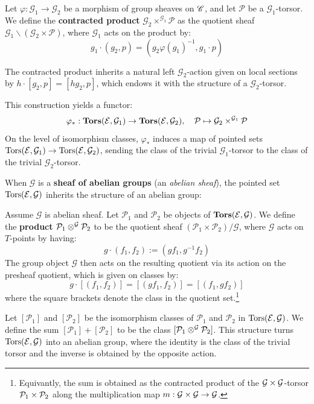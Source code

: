 \begin{definition}
Let $\varphi: \mathcal{G}_1 \to \mathcal{G}_2$ be a morphism of group 
sheaves on $\mathscr{C}$, and let $\mathcal{P}$ be a $\mathcal{G}_1$-torsor. We define the \textbf{contracted product} $\mathcal{G}_2 \times^{\mathcal{G}_1} \mathcal{P}$ as the quotient sheaf $\mathcal{G}_1 \backslash (\mathcal{G}_2 \times \mathcal{P})$, where $\mathcal{G}_1$ acts on the product by:
\[ g_1 \cdot (g_2, p) = (g_2 \varphi(g_1)^{-1}, g_1 \cdot p) \]

The contracted product inherits a natural left $\mathcal{G}_2$-action given on local sections by $h \cdot [g_2, p] = [h g_2, p]$, which endows it with the structure of a $\mathcal{G}_2$-torsor. 
\end{definition}

This construction yields a functor:
\[ \varphi_*: \mathbf{Tors}(\mathcal{E}, \mathcal{G}_1) \to \mathbf{Tors}(\mathcal{E}, \mathcal{G}_2), \quad \mathcal{P} \mapsto \mathcal{G}_2 \times^{\mathcal{G}_1} \mathcal{P} \]
On the level of isomorphism classes, $\varphi_*$ induces a map of pointed sets $\mathrm{Tors}(\mathcal{E}, \mathcal{G}_1) \to \mathrm{Tors}(\mathcal{E}, \mathcal{G}_2)$, sending the class of the trivial $\mathcal{G}_1$-torsor to the class of the trivial $\mathcal{G}_2$-torsor.

When $\mathcal{G}$ is a \textbf{sheaf of abelian groups} (an \textit{abelian sheaf}), the pointed set $\mathrm{Tors}(\mathcal{E}, \mathcal{G})$ 
inherits the structure of an abelian group:
\begin{definition}
    Assume $\mathcal{G}$ is abelian sheaf. Let $\mathcal{P}_1$ and $\mathcal{P}_2$ be objects of $\mathbf{Tors}(\mathcal{E}, \mathcal{G})$. 
    We define the \textbf{product} $\mathcal{P}_1 \otimes^{\mathcal{G}} \mathcal{P}_2$ to be the quotient sheaf 
    $(\mathcal{P}_1 \times \mathcal{P}_2)/\mathcal{G}$, where $\mathcal{G}$ acts on $T$-points by having:
    \[ g \cdot (f_1, f_2) := (g f_1, g^{-1} f_2) \]
    The group object $\mathcal{G}$ then acts on the resulting quotient via its action on the presheaf quotient, which is given on classes by:
    \[ g \cdot [(f_1, f_2)] = [(g f_1, f_2)] = [(f_1, g f_2)] \]
    where the square brackets denote the class in the quotient set.\footnote{
    Equivantly, the sum is obtained as the contracted product of the $\mathcal{G} \times \mathcal{G}$-torsor $\mathcal{P}_1 \times \mathcal{P}_2$ along the multiplication map
$m: \mathcal{G} \times \mathcal{G} \to \mathcal{G}$. }
\end{definition}

Let $[\mathcal{P}_1]$ and $[\mathcal{P}_2]$ be the isomorphism classes of $\mathcal{P}_1$ and $\mathcal{P}_2$ in $\mathrm{Tors}(\mathcal{E}, \mathcal{G})$.
We define the sum $[\mathcal{P}_1] + [\mathcal{P}_2]$ to be the class $[\mathcal{P}_1 \otimes^{\mathcal{G}} \mathcal{P}_2]$.
This structure turns $\mathrm{Tors}(\mathcal{E}, \mathcal{G})$ into an abelian group, 
where the identity is the class of the trivial torsor and the inverse is obtained by the opposite action.

